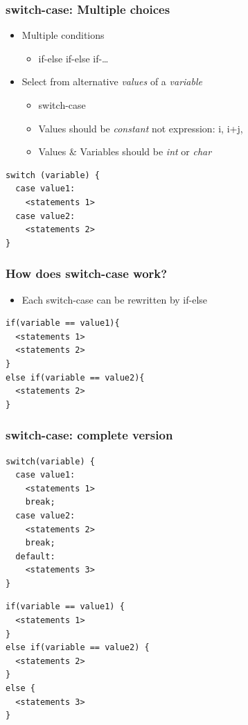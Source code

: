 \documentclass{../c-lecture}
\begin{document}
\begin{frame}[fragile]
  \frametitle{switch-case: Multiple choices}
  \begin{itemize}
    \item Multiple conditions
    \begin{itemize}
      \item if-else if-else if-\ldots
    \end{itemize}
    \item
      Select from alternative \textit{\color{Orange} values} of a
      \textit{\color{LimeGreen} variable}

    \begin{itemize}
      \item switch-case
      \item
        Values should be \textit{\color{Orange} constant} not expression:
        i, i+j,

      \item
        Values \& Variables should be \textit{\color{Orange} int} or
        \textit{\color{Orange} char}

    \end{itemize}
  \end{itemize}
  \begin{verbatim}
switch (variable) {
  case value1:
    <statements 1>
  case value2:
    <statements 2>
}
  \end{verbatim}
\end{frame}

\begin{frame}[fragile]
  \frametitle{How does switch-case work?}
  \begin{itemize}
    \item Each switch-case can be rewritten by if-else
  \end{itemize}
  \begin{verbatim}
if(variable == value1){
  <statements 1>
  <statements 2>
}
else if(variable == value2){
  <statements 2>
}
  \end{verbatim}
\end{frame}

\begin{frame}[fragile]
  \frametitle{switch-case: complete version}
  \begin{verbatim}
switch(variable) {
  case value1:
    <statements 1>
    break;
  case value2:
    <statements 2>
    break;
  default:
    <statements 3>
}
  \end{verbatim}
  \begin{verbatim}
if(variable == value1) {
  <statements 1>
}
else if(variable == value2) {
  <statements 2>
}
else {
  <statements 3>
}
  \end{verbatim}
\end{frame}
\end{document}
